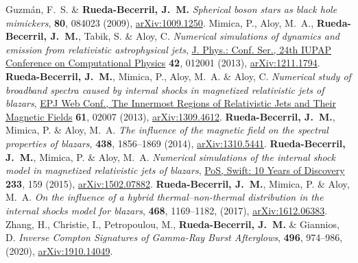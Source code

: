 \begin{thebibliography}{99}
 Guzmán, F.~S. \& \textbf{Rueda-Becerril, J.~M.} \textit{Spherical boson stars as black hole mimickers},  \href{https://doi.org/10.1103/PhysRevD.80.084023}{\prd} \textbf{80}, 084023 (2009), \href{https://arxiv.org/abs/1009.1250}{arXiv:1009.1250}.
%
 Mimica, P., Aloy, M.~A., \textbf{Rueda-Becerril, J.~M.}, Tabik, S. \& Aloy, C. \emph{Numerical simulations of dynamics and emission from relativistic astrophysical jets}, \href{https://doi.org/10.1088/1742-6596/454/1/012001}{J. Phys.: Conf. Ser., 24th IUPAP Conference on Computational Physics} \textbf{42}, 012001 (2013), \href{https://arxiv.org/abs/1211.1794}{arXiv:1211.1794}.
%
 \textbf{Rueda-Becerril, J.~M.}, Mimica, P., Aloy, M.~A. \& Aloy, C. \emph{Numerical study of broadband spectra caused by internal shocks in magnetized relativistic jets of blazars}, \href{https://doi.org/10.1051/epjconf/20136102007}{EPJ Web Conf., The Innermost Regions of Relativistic Jets and Their Magnetic Fields} \textbf{61}, 02007 (2013), \href{https://arxiv.org/abs/1309.4612}{arXiv:1309.4612}.
%
 \textbf{Rueda-Becerril, J.~M.}, Mimica, P. \& Aloy, M.~A. \textit{The influence of the magnetic field on the spectral properties of blazars}, \href{https://doi.org/10.1093/mnras/stt2335}{\mnras} \textbf{438}, 1856--1869 (2014), \href{https://arxiv.org/abs/1310.5441}{arXiv:1310.5441}.
%
 \textbf{Rueda-Becerril, J.~M.}, Mimica, P. \& Aloy, M.~A. \emph{Numerical simulations of the internal shock model in magnetized relativistic jets of blazars}, \href{https://doi.org/10.22323/1.233.0159}{PoS, Swift: 10 Years of Discovery} \textbf{233}, 159 (2015), \href{https://arxiv.org/abs/1502.07882}{arXiv:1502.07882}.
%
 \textbf{Rueda-Becerril, J.~M.}, Mimica, P. \& Aloy, M.~A. \textit{On the influence of a hybrid thermal--non-thermal distribution in the internal shocks model for blazars}, \href{https://doi.org/10.1093/mnras/stx476}{\mnras} \textbf{468}, 1169--1182, (2017), \href{https://arxiv.org/abs/1612.06383}{arXiv:1612.06383}.
%
 Zhang, H., Christie, I., Petropoulou, M., \textbf{Rueda-Becerril, J.~M.} \& Giannios, D. \textit{Inverse Compton Signatures of Gamma-Ray Burst Afterglows}, \href{https://doi.org/10.1093/mnras/staa1583}{\mnras} \textbf{496}, 974--986, (2020), \href{https://arxiv.org/abs/1910.14049}{arXiv:1910.14049}.

\end{thebibliography}
